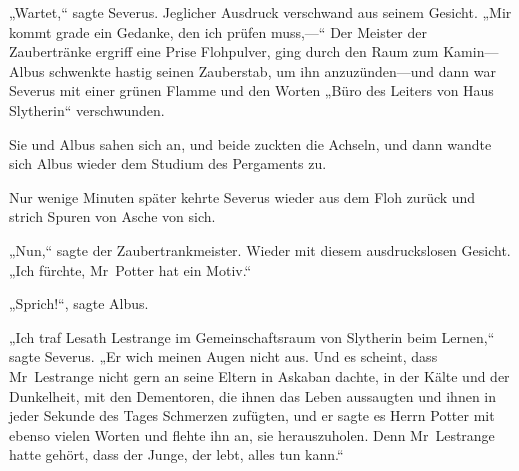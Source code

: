 „Wartet,“ sagte Severus. Jeglicher Ausdruck verschwand aus seinem Gesicht. „Mir kommt grade ein Gedanke, den ich prüfen muss,—“ Der Meister der Zaubertränke ergriff eine Prise Flohpulver, ging durch den Raum zum Kamin—Albus schwenkte hastig seinen Zauberstab, um ihn anzuzünden—und dann war Severus mit einer grünen Flamme und den Worten „Büro des Leiters von Haus Slytherin“ verschwunden.

Sie und Albus sahen sich an, und beide zuckten die Achseln, und dann wandte sich Albus wieder dem Studium des Pergaments zu.

Nur wenige Minuten später kehrte Severus wieder aus dem Floh zurück und strich Spuren von Asche von sich.

„Nun,“ sagte der Zaubertrankmeister. Wieder mit diesem ausdruckslosen Gesicht. „Ich fürchte, Mr~Potter hat ein Motiv.“

„Sprich!“, sagte Albus.

„Ich traf Lesath Lestrange im Gemeinschaftsraum von Slytherin beim Lernen,“ sagte Severus. „Er wich meinen Augen nicht aus. Und es scheint, dass Mr~Lestrange nicht gern an seine Eltern in Askaban dachte, in der Kälte und der Dunkelheit, mit den Dementoren, die ihnen das Leben aussaugten und ihnen in jeder Sekunde des Tages Schmerzen zufügten, und er sagte es Herrn Potter mit ebenso vielen Worten und flehte ihn an, sie herauszuholen. Denn Mr~Lestrange hatte gehört, dass der Junge, der lebt, alles tun kann.“

